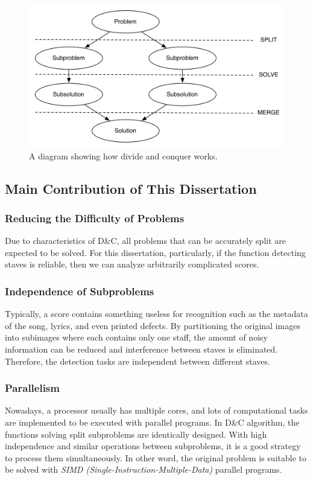 \begin{figure}[!htb]
    \centering
    \includegraphics[width=\textwidth]{figsrc/DnC.png}
    \caption{A diagram showing how divide and conquer works.\label{fig:DnC}}
\end{figure}

\subsection{Main Contribution of This Dissertation}
\label{subsec:advantages}

\subsubsection{Reducing the Difficulty of Problems}

Due to characteristics of D\&C, all problems that can be accurately split are expected to be solved. For this dissertation, particularly, if the function detecting staves is reliable, then we can analyze arbitrarily complicated scores.

\subsubsection{Independence of Subproblems}

Typically, a score contains something useless for recognition such as the metadata of the song, lyrics, and even printed defects. By partitioning the original images into subimages where each contains only one staff, the amount of noisy information can be reduced and interference between staves is eliminated. Therefore, the detection tasks are independent between different staves.

\subsubsection{Parallelism}

Nowadays, a processor usually has multiple cores, and lots of computational tasks are implemented to be executed with parallel programs. In D\&C algorithm, the functions solving split subproblems are identically designed. With high independence and similar operations between subproblems, it is a good strategy to process them simultaneously. In other word, the original problem is suitable to be solved with \emph{SIMD (Single-Instruction-Multiple-Data)} parallel programs.
